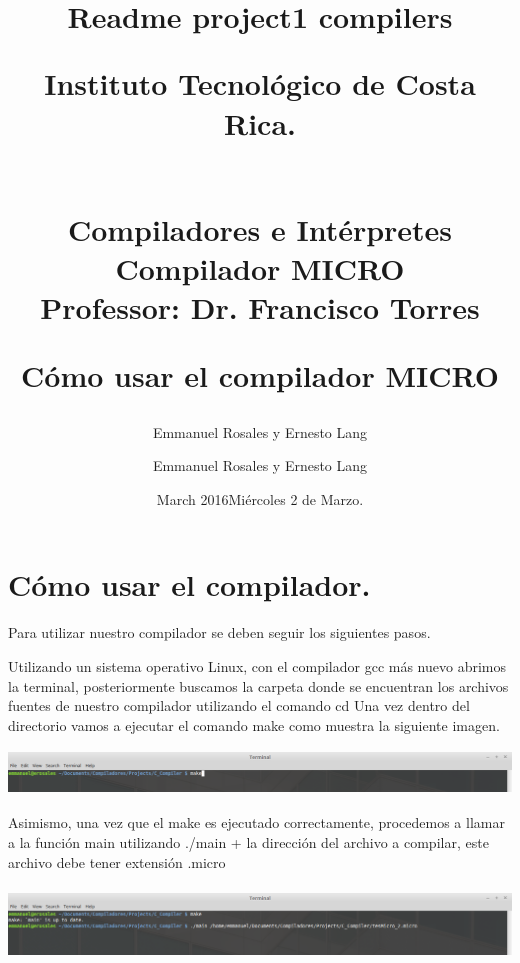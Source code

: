 \documentclass[12pt]{article}
\title{Readme project1 compilers}
\author{Emmanuel Rosales y Ernesto Lang }
\date{March 2016}
\begin{document}
\title{
		\begin{huge}
		Instituto Tecnol\'ogico de Costa Rica.
	   \end{huge}
	   \newline
	   \begin{Large}
	   \\Compiladores e Int\'erpretes
	   \\Compilador MICRO
   	   \\Professor: Dr. Francisco Torres
	  \end{Large}
	   }
\author{Emmanuel Rosales y Ernesto Lang }
\date{Mi\'ercoles 2 de Marzo.}

\maketitle
\newpage
\section{C\'omo usar el compilador.}
\title{
		\begin{large} 
		\textbf{C\'omo usar el compilador MICRO} 
	   \end{large} 
	   } 
	\newline 
    Para utilizar nuestro compilador se deben seguir los siguientes pasos.
    
    
    Utilizando un sistema operativo Linux, con el compilador gcc más nuevo abrimos la terminal, posteriormente buscamos la carpeta donde se encuentran los archivos fuentes de nuestro compilador utilizando el comando cd
    Una vez dentro del directorio vamos a ejecutar el comando make como muestra la siguiente imagen.
   
    \begin{center}
    \includegraphics[height= 1.2cm]{main1}
    \end{center}

    
    Asimismo, una vez que el make es ejecutado correctamente, procedemos a llamar a la función main utilizando ./main + la dirección del archivo a compilar, este archivo debe tener extensión .micro
    
	\begin{center}
    \includegraphics[height= 2cm]{main2}
    \end{center}
    
\end{document}
